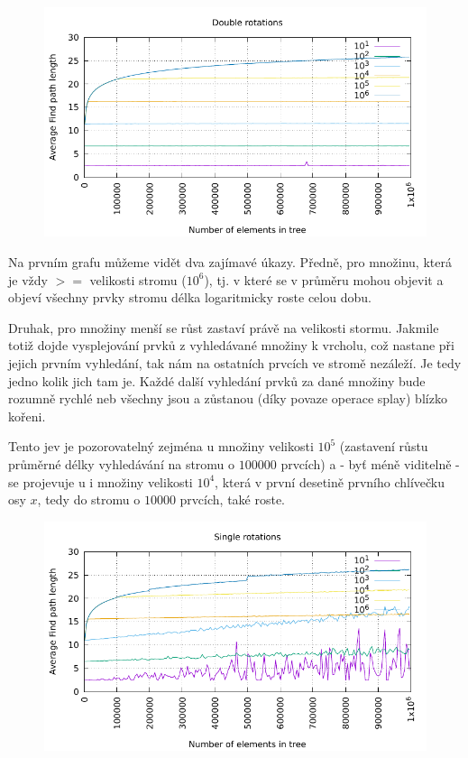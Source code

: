 \documentclass[12pt,a4paper]{report}
\begin{document}
	
	\begin{figure}[h]	
		\centering	
		\includegraphics[scale=0.75]{graph_1}		
	\end{figure}

Na prvním grafu můžeme vidět dva zajímavé úkazy. Předně, pro množinu, která je vždy $>=$ velikosti stromu ($10^6$), tj. v které se v průměru mohou objevit a objeví všechny prvky stromu délka logaritmicky roste celou dobu. 

Druhak, pro množiny menší se růst zastaví právě na velikosti stormu. Jakmile totiž dojde vysplejování prvků z vyhledávané množiny k vrcholu, což nastane při jejich prvním vyhledání, tak nám na ostatních prvcích ve stromě  nezáleží. Je tedy jedno kolik jich tam je. Každé další vyhledání prvků za dané množiny bude rozumně rychlé neb všechny jsou a zůstanou (díky povaze operace splay) blízko kořeni. 

Tento jev je pozorovatelný zejména u množiny velikosti $10^5$ (zastavení růstu průměrné délky vyhledávání na stromu o $100 000$ prvcích) a - byť méně viditelně - se projevuje u i množiny velikosti $10^4$, která v první desetině prvního chlívečku osy $x$, tedy do stromu o $10 000$ prvcích, také roste.

	\begin{figure}[h]	
		\centering	
		\includegraphics[scale=0.75]{graph_2}		
	\end{figure}
\end{document}
